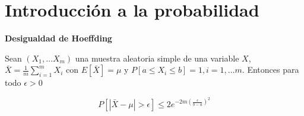 \section{Introducción a la probabilidad}
\begin{lemma} \textbf{Desigualdad de Hoeffding}

Sean $(X_1, \ldots X_m)$ una muestra aleatoria simple de una variable $X$, 
$\bar{X} = \frac{1}{m} \sum_{i=1}^m X_i$ con $E[\bar{X}] = \mu$ y $P[a \le X_i \le b] = 1, i=1, \ldots m$. 
Entonces para todo $\epsilon > 0$

\[P\left[\left| \bar{X} - \mu \right| > \epsilon \right] \le 2e^{-2m \left(\frac{\epsilon}{b-a}\right)^2}\]
\end{lemma}